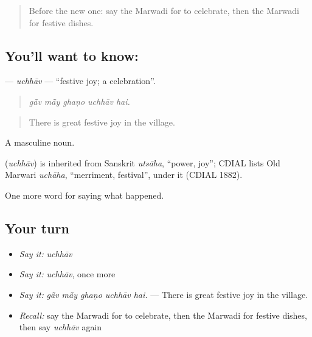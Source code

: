 \label{lesson:MW-C250-uchhav}



\begin{quote}
Before the new one: say the Marwadi for to celebrate, then the Marwadi for festive dishes.
\end{quote}

\subsection*{You'll want to know: }
\textbf{} — \emph{uchhāv} — \textquotedblleft{}festive joy; a celebration\textquotedblright{}.

\begin{quote}
    
\end{quote}

\begin{quote}
\emph{gā̃v mā̃y ghaṇo uchhāv hai.}
\end{quote}

\begin{quote}
There is great festive joy in the village.
\end{quote}

A masculine noun.

\begin{cousinweb}
\textbf{} (\emph{uchhāv}) is inherited from Sanskrit \emph{utsāha}, \textquotedblleft{}power, joy\textquotedblright{}; CDIAL lists Old Marwari \emph{uchāha}, \textquotedblleft{}merriment, festival\textquotedblright{}, under it (CDIAL 1882).
\end{cousinweb}

\begin{grammarlens}[title={What you've built}]
One more word for saying what happened.
\end{grammarlens}

\subsection*{Your turn}
\begin{itemize}
\raggedright
  \item \emph{Say it:} \emph{uchhāv}
  \item \emph{Say it:} \emph{uchhāv}, once more
  \item \emph{Say it:} \emph{gā̃v mā̃y ghaṇo uchhāv hai.} — There is great festive joy in the village.
  \item \emph{Recall:} say the Marwadi for to celebrate, then the Marwadi for festive dishes, then say \emph{uchhāv} again
\end{itemize}

